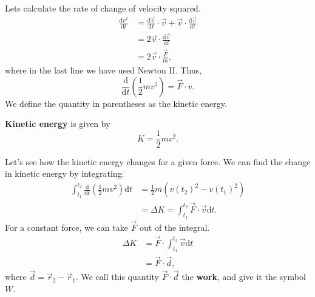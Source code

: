 \documentclass[../classical_mechanics.tex]{subfiles}
\begin{document}
        \paragraph{}
        Lets calculate the rate of change of velocity squared.
        \begin{align}
            \frac{\mathrm{d}v^2}{\mathrm{d}t}&=\frac{\mathrm{d}\vec{v}}{\mathrm{d}t}\cdot\vec{v}+\vec{v}\cdot\frac{\mathrm{d}\vec{v}}{\mathrm{d}t}\\
            &=2\vec{v}\cdot\frac{\mathrm{d}\vec{v}}{\mathrm{d}t}\\
            &=2\vec{v}\cdot\frac{\vec{F}}{m},
        \end{align}
        where in the last line we have used Newton II. Thus,
        \begin{equation}
            \frac{\mathrm{d}}{\mathrm{d}t}\left(\frac{1}{2}mv^2\right)=\vec{F}\cdot{v}.
        \end{equation}
        We define the quantity in parentheses as the kinetic energy.
        \begin{definition}
            \textbf{Kinetic energy} is given by
            \begin{equation}
                K=\frac{1}{2}mv^2.
            \end{equation}
        \end{definition}
        Let's see how the kinetic energy changes for a given force. We can find the change in kinetic energy by integrating:
        \begin{align}
            \int_{t_1}^{t_2}\frac{\mathrm{d}}{\mathrm{d}t}\left(\frac{1}{2}mv^2\right)\mathrm{d}t&=\frac{1}{2}m(v(t_2)^2-v(t_1)^2)\\
            &=\Delta K=\int_{t_1}^{t_2}\vec{F}\cdot\vec{v}\mathrm{d}t.
        \end{align}
        For a constant force, we can take $\vec{F}$ out of the integral.
        \begin{align}
            \Delta K &= \vec{F}\cdot\int_{t_1}^{t_2}\vec{v}\mathrm{d}t\\
            &=\vec{F}\cdot\vec{d},
        \end{align}
        where $\vec{d}=\vec{r}_2-\vec{r}_1$.
        We call this quantity $\vec{F}\cdot\vec{d}$ the \textbf{work}, and give it the symbol $W$.
\end{document}
